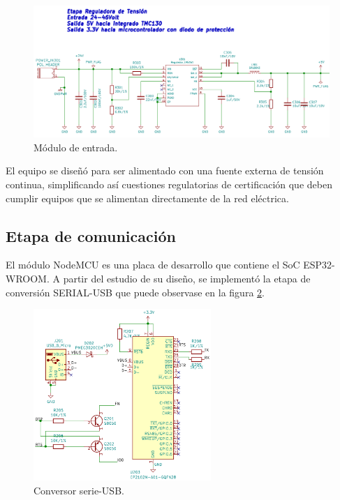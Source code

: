 \begin{figure}[h!]
	\centering
	\includegraphics[width=1\textwidth]{./Figures/kicad_tension_v2.png}
	\caption{Módulo de entrada.}
	\label{fig:kicad_tension}
\end{figure}
  
El equipo se diseñó para ser alimentado con una fuente externa de tensión continua, simplificando así cuestiones regulatorias de certificación que deben cumplir equipos que se alimentan directamente de la red eléctrica.

\subsection{Etapa de comunicación}

El módulo NodeMCU es una placa de desarrollo que contiene el SoC ESP32-WROOM. A partir del estudio de su diseño, se implementó la etapa de conversión SERIAL-USB que puede observase en la figura \ref{fig:kicad_conversor}. 


\begin{figure}[h!]
	\centering
	\includegraphics[width=0.6\textwidth]{./Figures/kicad_conversor_v1.png}
	\caption{Conversor serie-USB.}
	\label{fig:kicad_conversor}
\end{figure}

